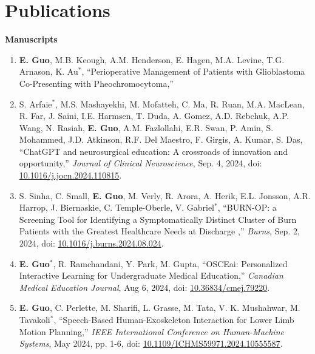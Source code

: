 \documentclass{article}
\begin{document}
\section*{\textcolor{my_colour}{Publications}}
\vspace{-.25em} \hrulefill \vspace{.25em}

\textbf{Manuscripts} \vspace{.5em}

\begin{enumerate}
    \item \textbf{E. Guo}, M.B. Keough, A.M. Henderson, E. Hagen, M.A. Levine, T.G. Arnason, K. Au$^*$, ``Perioperative Management of Patients with Glioblastoma Co-Presenting with Pheochromocytoma,'' \item S. Arfaie$^*$, M.S. Mashayekhi, M. Mofatteh, C. Ma, R. Ruan, M.A. MacLean, R. Far, J. Saini, I.E. Harmsen, T. Duda, A. Gomez, A.D. Rebchuk, A.P. Wang, N. Rasiah, \textbf{E. Guo}, A.M. Fazlollahi, E.R. Swan, P. Amin, S. Mohammed, J.D. Atkinson, R.F. Del Maestro, F. Girgis, A. Kumar, S. Das, ``ChatGPT and neurosurgical education: A crossroads of innovation and opportunity,'' \textit{Journal of Clinical Neuroscience}, Sep. 4, 2024, doi: \href{https://doi.org/10.1109/ICHMS59971.2024.10555587}{10.1016/j.jocn.2024.110815}.
    \item S. Sinha, C. Small, \textbf{E. Guo}, M. Verly, R. Arora, A. Herik, E.L. Jonsson, A.R. Harrop, J. Biernaskie, C. Temple-Oberle, V. Gabriel$^*$, ``BURN-OP: a Screening Tool for Identifying a Symptomatically Distinct Cluster of Burn Patients with the Greatest Healthcare Needs at Discharge ,'' \textit{Burns}, Sep. 2, 2024, doi: \href{https://doi.org/10.1016/j.burns.2024.08.024}{10.1016/j.burns.2024.08.024}.
    \item \textbf{E. Guo}$^*$, R. Ramchandani, Y. Park, M. Gupta, ``OSCEai: Personalized Interactive Learning for Undergraduate Medical Education,'' \textit{Canadian Medical Education Journal}, Aug 6, 2024, doi: \href{https://doi.org/10.36834/cmej.79220}{10.36834/cmej.79220}.
    \item \textbf{E. Guo}, C. Perlette, M. Sharifi, L. Grasse, M. Tata, V. K. Mushahwar, M. Tavakoli$^*$, ``Speech-Based Human-Exoskeleton Interaction for Lower Limb Motion Planning,''  \textit{IEEE International Conference on Human-Machine Systems}, May 2024, pp. 1-6, doi: \href{https://doi.org/10.1109/ICHMS59971.2024.10555587}{10.1109/ICHMS59971.2024.10555587}.

\end{enumerate}
\end{document}
